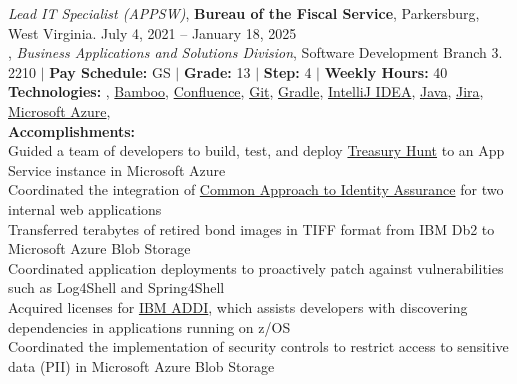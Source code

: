\documentclass[10pt]{res} %
\begin{document}
\begin{resume}
{\sl Lead IT Specialist (APPSW)}, {\bf Bureau of the Fiscal Service}, Parkersburg, West Virginia. \hfill July 4, 2021 -- January 18, 2025 \\
\hspace*{1em}{\bf Information and Security Services (ISS)}, {\sl Business Applications and Solutions Division}, Software Development Branch 3. \\
\hspace*{1em}{\bf Series:} 2210 $|$ {\bf Pay Schedule:} GS $|$ {\bf Grade:} 13 $|$ {\bf Step:} 4 $|$ {\bf Weekly Hours:} 40 \\
\hspace*{2em} {\bf Technologies:} \underline{}, \underline{Bamboo}, \underline{Confluence}, \underline{Git}, \underline{Gradle}, \underline{IntelliJ IDEA}, \underline{Java}, \underline{Jira}, \underline{Microsoft Azure}, \underline{} \\
\hspace*{2em} {\bf Accomplishments:} \\
\hspace*{3em} Guided a team of developers to build, test, and deploy \href{https://www.treasurydirect.gov/TH/}{\color{blue}Treasury Hunt\textsuperscript{\textregistered}} to an App Service instance in Microsoft Azure \\
\hspace*{3em} Coordinated the integration of \href{https://fiscal.treasury.gov/files/dnp/dnp-caia-implementation.pdf}{\color{blue}Common Approach to Identity Assurance} for two internal web applications \\
\hspace*{3em} Transferred terabytes of retired bond images in TIFF format from IBM Db2 to Microsoft Azure Blob Storage \\
\hspace*{3em} Coordinated application deployments to proactively patch against vulnerabilities such as Log4Shell and Spring4Shell \\
\hspace*{3em} Acquired licenses for {\href{https://www.ibm.com/products/app-discovery-and-delivery-intelligence}{\color{blue}IBM ADDI}}, which assists developers with discovering dependencies in applications running on z/OS\textsuperscript{\textregistered} \\
\hspace*{3em} Coordinated the implementation of security controls to restrict access to sensitive data (PII) in Microsoft Azure Blob Storage \\

\end{resume}
\end{document}
